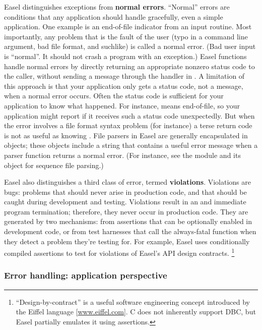 Easel distinguishes exceptions from \textbf{normal errors}. ``Normal''
errors are conditions that any application should handle gracefully,
even a simple application. One example is an end-of-file indicator
from an input routine. Most importantly, any problem that is the fault
of the user (typo in a command line argument, bad file format, and
suchlike) is called a normal error. (Bad user input is ``normal''. It
should not crash a program with an exception.) Easel functions handle
normal errors by directly returning an appropriate nonzero status code
to the caller, without sending a message through the handler in
. A limitation of this approach is that your
application only gets a status code, not a message, when a normal
error occurs. Often the status code is sufficient for your application
to know what happened. For instance,  means end-of-file,
so your application might report  if it
receives such a status code unexpectedly. But when the error involves
a file format syntax problem (for instance) a terse 
return code is not as useful as knowing . File parsers in
Easel are generally encapsulated in objects; these objects include a
 string that contains a useful error message when a
parser function returns a normal error. (For instance, see the
 module and its  object for sequence
file parsing.)

Easel also distinguishes a third class of error, termed
\textbf{violations}. Violations are bugs: problems that should never
arise in production code, and that should be caught during development
and testing. Violations result in an  and immediate
program termination; therefore, they never occur in production
code. They are generated by two mechanisms: from assertions that can
be optionally enabled in development code, or from test harnesses that
call the always-fatal  function when they detect a
problem they're testing for. For example, Easel uses conditionally
compiled assertions to test for violations of Easel's API design
contracts. \footnote{``Design-by-contract'' is a useful software
engineering concept introduced by the Eiffel language
[\url{www.eiffel.com}]. C does not inherently support DBC, but Easel
partially emulates it using assertions.}

\subsubsection{Error handling: application perspective}

